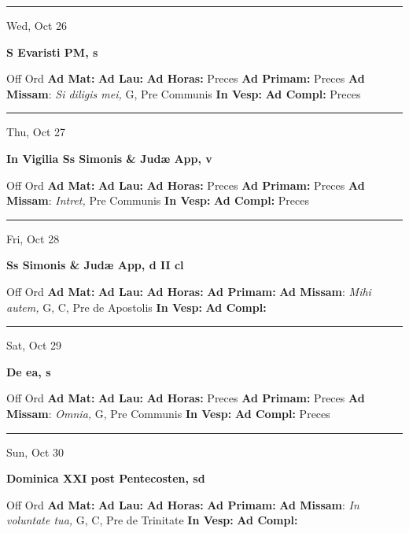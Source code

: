 \documentclass[letterpaper, 10pt]{article}
\begin{document}
\hrule
\begin{center}
Wed, Oct 26
\end{center}\textbf{ \large S Evaristi PM, \textnormal{\normalsize s}}
\begin{justify}
Off Ord
\textbf{Ad Mat: }
\textbf{Ad Lau: }
\textbf{Ad Horas: }Preces
\textbf{Ad Primam: }Preces
\textbf{Ad Missam}: \textit{Si diligis mei,} G, Pre Communis
\textbf{In Vesp: }
\textbf{Ad Compl: }Preces\end{justify}



\hrule
\begin{center}
Thu, Oct 27
\end{center}\textbf{ \large In Vigilia Ss Simonis \& Judæ App, \textnormal{\normalsize v}}
\begin{justify}
Off Ord
\textbf{Ad Mat: }
\textbf{Ad Lau: }
\textbf{Ad Horas: }Preces
\textbf{Ad Primam: }Preces
\textbf{Ad Missam}: \textit{Intret,} Pre Communis
\textbf{In Vesp: }
\textbf{Ad Compl: }Preces\end{justify}



\hrule
\begin{center}
Fri, Oct 28
\end{center}\textbf{ \large Ss Simonis \& Judæ App, \textnormal{\normalsize d II cl}}
\begin{justify}
Off Ord
\textbf{Ad Mat: }
\textbf{Ad Lau: }
\textbf{Ad Horas: }
\textbf{Ad Primam: }
\textbf{Ad Missam}: \textit{Mihi autem,} G, C, Pre de Apostolis
\textbf{In Vesp: }
\textbf{Ad Compl: }\end{justify}



\hrule
\begin{center}
Sat, Oct 29
\end{center}\textbf{ \large De ea, \textnormal{\normalsize s}}
\begin{justify}
Off Ord
\textbf{Ad Mat: }
\textbf{Ad Lau: }
\textbf{Ad Horas: }Preces
\textbf{Ad Primam: }Preces
\textbf{Ad Missam}: \textit{Omnia,} G, Pre Communis
\textbf{In Vesp: }
\textbf{Ad Compl: }Preces\end{justify}



\hrule
\begin{center}
Sun, Oct 30
\end{center}\textbf{ \large Dominica XXI post Pentecosten, \textnormal{\normalsize sd}}
\begin{justify}
Off Ord
\textbf{Ad Mat: }
\textbf{Ad Lau: }
\textbf{Ad Horas: }
\textbf{Ad Primam: }
\textbf{Ad Missam}: \textit{In voluntate tua,} G, C, Pre de Trinitate
\textbf{In Vesp: }
\textbf{Ad Compl: }\end{justify}
\end{document}
